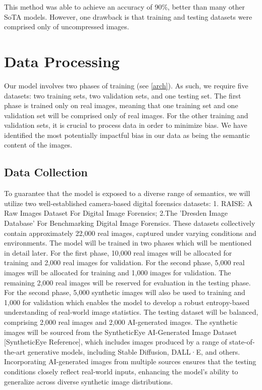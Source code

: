 \documentclass{article} %
\begin{document}
This method was able to achieve an accuracy of 90\%, better than many other SoTA models. However, one drawback is that training and testing datasets were comprised only of uncompressed images.

\section{Data Processing}
\label{data}
Our model involves two phases of training (see \ref{arch}). As such, we require five datasets: two training sets, two validation sets, and one testing set. The first phase is trained only on real images, meaning that one training set and one validation set will be comprised only of real images. For the other training and validation sets, it is crucial to process data in order to minimize bias. We have identified the most potentially impactful bias in our data as being the semantic content of the images.

\subsection{Data Collection}
To guarantee that the model is exposed to a diverse range of semantics, we will utilize two well-established camera-based digital forensics datasets: 1. RAISE: A Raw Images Dataset For Digital Image Forensics; 2.The 'Dresden Image Database' For Benchmarking Digital Image Forensics. These datasets collectively contain approximately 22,000 real images, captured under varying conditions and environments. The model will be trained in two phases which will be mentioned in detail later. For the first phase, 10,000 real images will be allocated for training and 2,000 real images for validation. For the second phase, 5,000 real images will be allocated for training and 1,000 images for validation. The remaining 2,000 real images will be reserved for evaluation in the testing phase. For the second phase, 5,000 synthetic images will also be used to training and 1,000 for validation which enables the model to develop a robust entropy-based understanding of real-world image statistics.
The testing dataset will be balanced, comprising 2,000 real images and 2,000 AI-generated images. The synthetic images will be sourced from the SyntheticEye AI-Generated Image Dataset [SyntheticEye Reference], which includes images produced by a range of state-of-the-art generative models, including Stable Diffusion, DALL·E, and others. Incorporating AI-generated images from multiple sources ensures that the testing conditions closely reflect real-world inputs, enhancing the model's ability to generalize across diverse synthetic image distributions.
\end{document}
